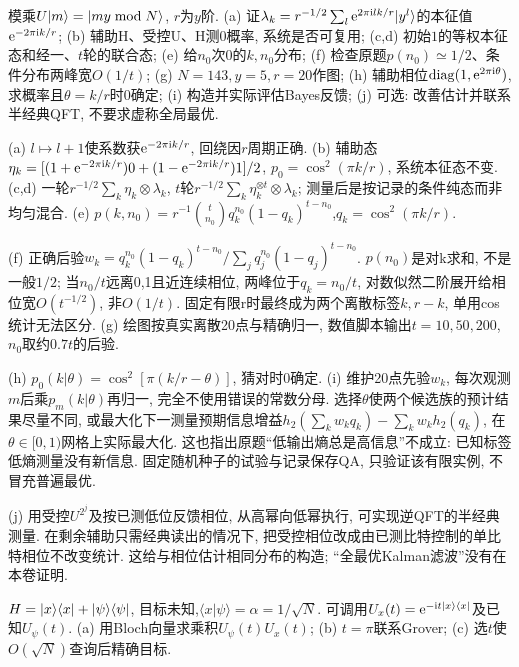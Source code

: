 \begin{exercise}模乘$U\lvert m\rangle=\lvert my\bmod N\rangle$, $r$为$y$阶. (a) 证$\lambda_k=r^{-1/2}\sum_l\mathrm e^{2\pi\mathrm i lk/r}\lvert y^l\rangle$的本征值$\mathrm e^{-2\pi\mathrm i k/r}$; (b) 辅助H、受控U、H测0概率, 系统是否可复用; (c,d) 初始$1$的等权本征态和经一、$t$轮的联合态; (e) 给$n_0$次0的$k,n_0$分布; (f) 检查原题$p(n_0)\simeq1/2$、条件分布两峰宽$O(1/t)$; (g) $N=143,y=5,r=20$作图; (h) 辅助相位$\operatorname{diag}(1,\mathrm e^{2\pi\mathrm i\theta})$, 求概率且$\theta=k/r$时0确定; (i) 构造并实际评估Bayes反馈; (j) 可选: 改善估计并联系半经典QFT, 不要求虚称全局最优.\end{exercise}
\begin{solution}(a) $l\mapsto l+1$使系数获$\mathrm e^{-2\pi\mathrm i k/r}$, 回绕因$r$周期正确. (b) 辅助态$\eta_k=[(1+\mathrm e^{-2\pi\mathrm i k/r})0+(1-\mathrm e^{-2\pi\mathrm i k/r})1]/2$, $p_0=\cos^2(\pi k/r)$, 系统本征态不变. (c,d) 一轮$r^{-1/2}\sum_k\eta_k\otimes\lambda_k$, $t$轮$r^{-1/2}\sum_k\eta_k^{\otimes t}\otimes\lambda_k$; 测量后是按记录的条件纯态而非均匀混合. (e) $p(k,n_0)=r^{-1}\binom t{n_0}q_k^{n_0}(1-q_k)^{t-n_0}$,$q_k=\cos^2(\pi k/r)$.

(f) 正确后验$w_k=q_k^{n_0}(1-q_k)^{t-n_0}/\sum_jq_j^{n_0}(1-q_j)^{t-n_0}$. $p(n_0)$是对k求和, 不是一般$1/2$; 当$n_0/t$远离0,1且近连续相位, 两峰位于$q_k=n_0/t$, 对数似然二阶展开给相位宽$O(t^{-1/2})$, 非$O(1/t)$. 固定有限r时最终成为两个离散标签$k,r-k$, 单用cos统计无法区分. (g) 绘图按真实离散20点与精确归一, 数值脚本输出$t=10,50,200$,$n_0$取约$0.7t$的后验.

(h) $p_0(k|\theta)=\cos^2[\pi(k/r-\theta)]$, 猜对时0确定. (i) 维护20点先验$w_k$, 每次观测$m$后乘$p_m(k|\theta)$再归一, 完全不使用错误的常数分母. 选择$\theta$使两个候选族的预计结果尽量不同, 或最大化下一测量预期信息增益$h_2(\sum_kw_kq_k)-\sum_kw_kh_2(q_k)$, 在$\theta\in[0,1)$网格上实际最大化. 这也指出原题“低输出熵总是高信息”不成立: 已知标签低熵测量没有新信息. 固定随机种子的试验与记录保存QA, 只验证该有限实例, 不冒充普遍最优.

(j) 用受控$U^{2^j}$及按已测低位反馈相位, 从高幂向低幂执行, 可实现逆QFT的半经典测量. 在剩余辅助只需经典读出的情况下, 把受控相位改成由已测比特控制的单比特相位不改变统计. 这给与相位估计相同分布的构造; “全最优Kalman滤波”没有在本卷证明.
\end{solution}
\begin{exercise}$H=\lvert x\rangle\langle x\rvert+\lvert \psi\rangle\langle \psi\rvert$, 目标未知,$\langle x|\psi\rangle=\alpha=1/\sqrt N$. 可调用$U_x(t)=\mathrm e^{-\mathrm i t\lvert x\rangle\langle x\rvert}$及已知$U_\psi(t)$. (a) 用Bloch向量求乘积$U_\psi(t)U_x(t)$; (b) $t=\pi$联系Grover; (c) 选$t$使$O(\sqrt N)$查询后精确目标.\end{exercise}
